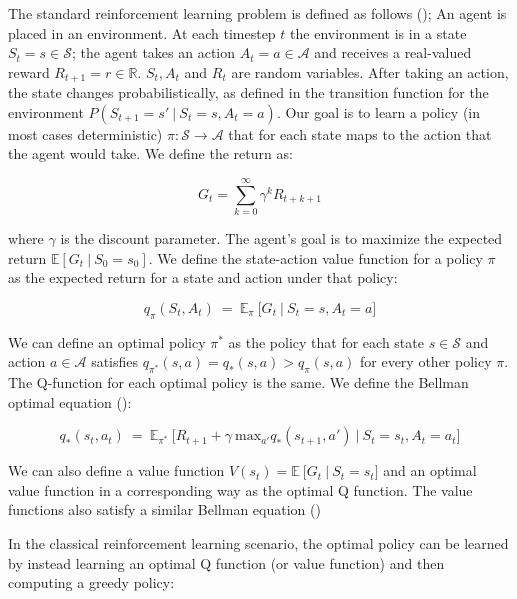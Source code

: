 \documentclass{article}
\newcommand{\citep}[2][]{(\cite[#1]{#2})}
\newcommand{\giv}{\ |\ }
\begin{document}
The standard reinforcement learning problem is defined as follows \citep{sutton_reinforcement_1998}; An agent is placed in an environment. At each timestep $t$ the environment is in a state $S_t = s \in \mathcal{S}$; the agent takes an action $A_t = a \in \mathcal{A}$ and receives a real-valued reward $R_{t+1} = r \in \mathbb{R}$. $S_t, A_t$ and $R_t$ are random variables. After taking an action, the state changes probabilistically, as defined in the transition function for the environment $P(S_{t+1} = s' \giv S_t = s, A_t = a)$. Our goal is to learn a policy (in most cases deterministic) $\pi \colon \mathcal{S} \to \mathcal{A}$ that for each state maps to the action that the agent would take. We define the return as:

\begin{equation}
    G_t = \sum_{k=0}^\infty \gamma^k R_{t + k + 1}
\end{equation}

where $\gamma$ is the discount parameter. The agent's goal is to maximize the expected return $\mathbb{E}[G_t \giv S_0 = s_0]$. We define the state-action value function for a policy $\pi$ as the expected return for a state and action under that policy:

\begin{equation}
    q_\pi(S_t, A_t)\ =\ \mathbb{E}_\pi\ \big[G_{t}\ |\ S_t = s, A_t = a \big]
\end{equation}

We can define an optimal policy $\pi^*$ as the policy that for each state $s \in \mathcal{S}$ and action $a \in \mathcal{A}$ satisfies $q_{\pi^*}(s,a) = q_*(s,a) > q_\pi(s, a)$ for every other policy $\pi$. The Q-function for each optimal policy is the same. We define the Bellman optimal equation \citep{sutton_reinforcement_1998}:

\begin{equation}
    q_*(s_t, a_t)\ =\ \mathbb{E}_{\pi^*}\ \big[ R_{t + 1} + \gamma\ \text{max}_{a'} q_*(s_{t+1}, a')\ |\ S_t = s_t, A_t = a_t\big]
\end{equation}

We can also define a value function $V(s_t) = \mathbb{E}\ \big[G_t\ |\ S_t = s_t \big]$ and an optimal value function in a corresponding way as the optimal Q function. The value functions also satisfy a similar Bellman equation \citep{sutton_reinforcement_1998}

In the classical reinforcement learning scenario, the optimal policy can be learned by instead learning an optimal Q function (or value function) and then computing a greedy policy:
\end{document}
